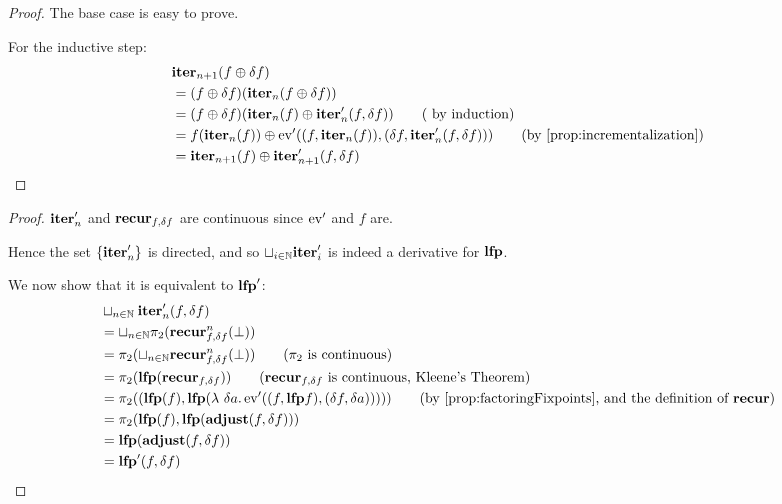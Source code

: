 \iterDerivativesF*
\begin{proof}
  \label{prf:iterDerivativesF}
  The base case is easy to prove.

  For the inductive step:
  \begin{align*}
    &\iter_{n+1}(f \cplus \change{f})\\
    &=(f \cplus \change{f})(\iter_{n}(f \cplus \change{f}))\\
    &= (f \cplus \change{f})(
        \iter_{n}(f)
        \cplus \derive{\iter_{n}}(f, \change{f})
      )
    \tag{ by induction}\\
    &= f(\iter_n(f)) \cplus \derive{\ev}((f, \iter_{n}(f)), (\change{f},
      \derive{\iter_{n}}(f, \change{f})))
    \tag{by \cref{prop:incrementalization}}\\
    & =\iter_{n+1}(f) \cplus \derive{\iter_{n+1}}(f, \change{f})
  \end{align*}
\end{proof}

\leastFixpointDerivatives*
\begin{proof}
  \label{prf:leastFixpointDerivatives}
  $\mathbf{iter}_n'$ and $\mathbf{recur}_{f, \delta f}$ are continuous since
  $\operatorname{ev}'$ and $f$ are.

  Hence the set $\{ \mathbf{iter}'_n \}$ is directed, and so $\sqcup_{i \in \mathbb{N}}
  \mathbf{iter}_i'$ is indeed a derivative for $\mathbf{lfp}$.

  We now show that it is equivalent to $\mathbf{lfp}'$:
  \begin{align*}
    &\sqcup_{n \in \NN} \derive{\iter_n}(f, \change{f})\\
    &=\sqcup_{n \in \NN} \pi_2(\nextiter_{f, \change{f}}^n(\bot))\\
    &=\pi_2(\sqcup_{n \in \NN} \nextiter_{f, \change{f}}^n(\bot)) \tag{$\pi_2$ is continuous}\\
    &= \pi_2 (\lfp(\nextiter_{f, \change{f}})) \tag{$\nextiter_{f, \change{f}}$ is continuous, Kleene's Theorem}\\
    &= \pi_2 ((\lfp(f), \lfp (\lambda\ \change{a}. \derive{\ev}((f, \lfp f), (\change{f}, \change{a})))))
    \tag{by \cref{prop:factoringFixpoints}, and the definition of $\nextiter$}\\
    &= \pi_2 (\lfp(f), \lfp(\adjust(f, \change{f})))\\
    &= \lfp(\adjust(f, \change{f}))\\
    &= \derive{\lfp}(f, \change{f})
  \end{align*}
\end{proof}

